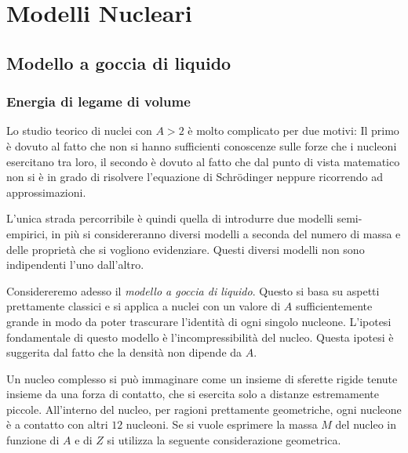 \chapter{Modelli Nucleari}
\section{Modello a goccia di liquido}
\subsection{Energia di legame di volume}
Lo studio teorico di nuclei con $A > 2$ è molto complicato per due motivi:
Il primo è dovuto al fatto che non si hanno sufficienti conoscenze sulle forze
che i nucleoni esercitano tra loro, il secondo è dovuto al fatto che dal punto
di vista matematico non si è in grado di risolvere l'equazione di
Schr\"{o}dinger neppure ricorrendo ad approssimazioni.

L'unica strada percorribile è quindi quella di introdurre due modelli
semi-empirici, in più si considereranno diversi modelli a seconda del numero di
massa e delle proprietà che si vogliono evidenziare. Questi diversi modelli non
sono indipendenti l'uno dall'altro.

Considereremo adesso il \textit{modello a goccia di liquido}.
Questo si basa su aspetti prettamente classici e si applica a nuclei con un
valore di $A$ sufficientemente grande in modo da poter trascurare l'identità di
ogni singolo nucleone. L'ipotesi fondamentale di questo modello è
l'incompressibilità del nucleo. Questa ipotesi è suggerita dal fatto che la
densità non dipende da $A$.

Un nucleo complesso si può immaginare come un insieme di sferette rigide tenute
insieme da una forza di contatto, che si esercita solo a distanze estremamente
piccole. All'interno del nucleo, per ragioni prettamente geometriche, ogni
nucleone è a contatto con altri $12$ nucleoni. Se si vuole esprimere la massa
$M$ del nucleo in funzione di $A$ e di $Z$ si utilizza la seguente
considerazione geometrica.

